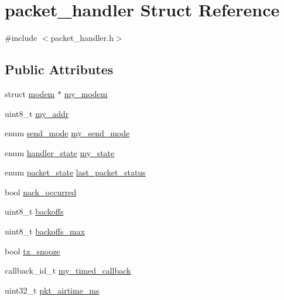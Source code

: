 \hypertarget{structpacket__handler}{}\section{packet\+\_\+handler Struct Reference}
\label{structpacket__handler}


{\ttfamily \#include $<$packet\+\_\+handler.\+h$>$}

\subsection*{Public Attributes}
\begin{DoxyCompactItemize}
\item 
struct \mbox{\hyperlink{structmodem}{modem}} $\ast$ \mbox{\hyperlink{structpacket__handler_a5e31603aa81c5e3a233e85f09630f443}{my\+\_\+modem}}
\item 
uint8\+\_\+t \mbox{\hyperlink{structpacket__handler_a4f29d292bd4d2732b7c0b59a1301dcb2}{my\+\_\+addr}}
\item 
enum \mbox{\hyperlink{packet__handler_8h_a83f2c1e421af1bc836ea53cc416205ab}{send\+\_\+mode}} \mbox{\hyperlink{structpacket__handler_a42b31c85f9e7c6d40673e279c1506076}{my\+\_\+send\+\_\+mode}}
\item 
enum \mbox{\hyperlink{packet__handler_8h_ae26a92a9fe08e1847e90f596f93f24bd}{handler\+\_\+state}} \mbox{\hyperlink{structpacket__handler_a66f2408583b84777de353d0d5955c153}{my\+\_\+state}}
\item 
enum \mbox{\hyperlink{packet__handler_8h_aacdc622aa02a946d7a3d67c361199733}{packet\+\_\+state}} \mbox{\hyperlink{structpacket__handler_ac93844a789a1027582e7b32917468e34}{last\+\_\+packet\+\_\+status}}
\item 
bool \mbox{\hyperlink{structpacket__handler_a8ac1ba5fd97235efa70445eaf7538b28}{nack\+\_\+occurred}}
\item 
uint8\+\_\+t \mbox{\hyperlink{structpacket__handler_ace8e4c388c89ec6bee329f46f4244688}{backoffs}}
\item 
uint8\+\_\+t \mbox{\hyperlink{structpacket__handler_a840afb7b3624f7610e5eb09fd3cebd08}{backoffs\+\_\+max}}
\item 
bool \mbox{\hyperlink{structpacket__handler_ab717deca06abb0b04f696c14a7231312}{tx\+\_\+snooze}}
\item 
callback\+\_\+id\+\_\+t \mbox{\hyperlink{structpacket__handler_abbef57602dd517871e774e639135ce30}{my\+\_\+timed\+\_\+callback}}
\item 
uint32\+\_\+t \mbox{\hyperlink{structpacket__handler_af9c15e3494d3d3eb7a47d45b69862ebf}{pkt\+\_\+airtime\+\_\+ms}}

\end{DoxyCompactItemize}
